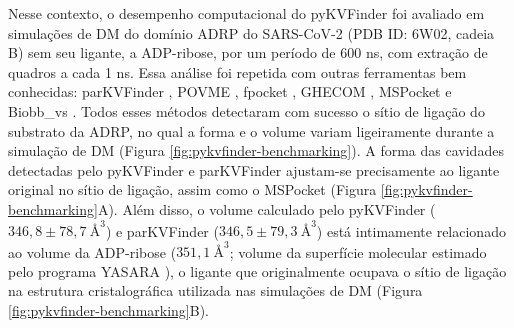 \documentclass[Portugues]{phdquali}
\newcommand{\mAA}{~\text{\AA}}
\begin{document}
Nesse contexto, o desempenho computacional do pyKVFinder foi avaliado em simulações de DM do domínio ADRP do SARS-CoV-2 (PDB ID: 6W02, cadeia B) sem seu ligante, a ADP-ribose, por um período de 600 ns, com extração de quadros a cada 1 ns. Essa análise foi repetida com outras ferramentas bem conhecidas: parKVFinder \cite{guerra2020}, POVME \cite{povme}, fpocket \cite{fpocket}, GHECOM \cite{ghecom}, MSPocket \cite{mspocket} e Biobb\_vs \cite{biobbvs}. Todos esses métodos detectaram com sucesso o sítio de ligação do substrato da ADRP, no qual a forma e o volume variam ligeiramente durante a simulação de DM (Figura \ref{fig:pykvfinder-benchmarking}). A forma das cavidades detectadas pelo pyKVFinder e parKVFinder ajustam-se precisamente ao ligante original no sítio de ligação, assim como o MSPocket (Figura \ref{fig:pykvfinder-benchmarking}A). Além disso, o volume calculado pelo pyKVFinder ($346,8 \pm 78,7 \mAA^3$) e parKVFinder ($346,5 \pm 79,3 \mAA^3$) está intimamente relacionado ao volume da ADP-ribose ($351,1 \mAA^3$; volume da superfície molecular estimado pelo programa YASARA \cite{yasara}), o ligante que originalmente ocupava o sítio de ligação na estrutura cristalográfica utilizada nas simulações de DM (Figura \ref{fig:pykvfinder-benchmarking}B).
\end{document}
